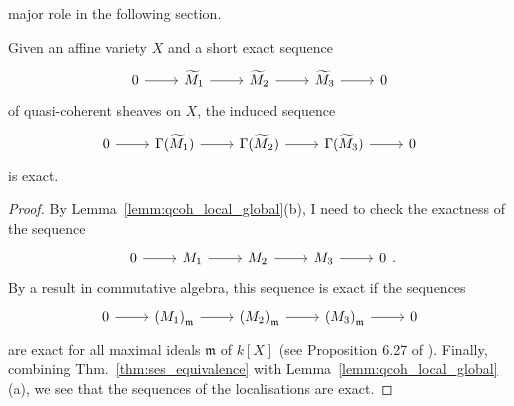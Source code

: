 major role in the following section.
\begin{prop}\label{prop:qcoh_gsec_exact}
  Given an affine variety $X$ and a short exact sequence
  \[\begin{tikzcd}
      0\rar & \cm_{1}\rar & \cm_{2}\rar & \cm_{3}\rar & 0
    \end{tikzcd}\]
  of quasi-coherent sheaves on $X$, the induced sequence
  \[\begin{tikzcd}
      0\rar & \Gamma(\cm_{1})\rar & \Gamma(\cm_{2})\rar
      & \Gamma(\cm_{3})\rar & 0
    \end{tikzcd}\]
  is exact.
\end{prop}
\begin{proof}
  By Lemma~\ref{lemm:qcoh_local_global}(b), I need to check the exactness of
  the sequence
  \[\begin{tikzcd}
      0\rar & M_{1}\rar & M_{2}\rar & M_{3}\rar & 0
    \end{tikzcd}.\]
  By a result in commutative algebra, this sequence is exact if the sequences
  \[\begin{tikzcd}
      0\rar & \left(M_{1}\right)_{\mathfrak{m}}\rar
      & \left(M_{2}\right)_{\mathfrak{m}}\rar
      & \left(M_{3}\right)_{\mathfrak{m}}\rar & 0
    \end{tikzcd}\]
  are exact for all maximal ideals $\mathfrak{m}$ of $k[X]$
  (see Proposition 6.27 of \cite{gathmann_comm}). Finally, combining
  Thm.~\ref{thm:ses_equivalence} with Lemma~\ref{lemm:qcoh_local_global}(a),
  we see that the sequences of the localisations are exact.
\end{proof}
